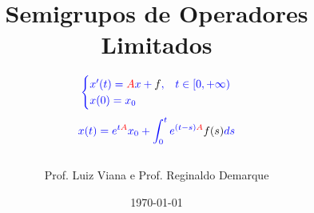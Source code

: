 \documentclass[envcountsect,aspectratio=169]{beamer}
\theoremstyle{definition}
\theoremstyle{exercicio}
\theoremstyle{something}
\theoremstyle{resp}
\theoremstyle{desafio}
\begin{document}
\title[Mini-Curso de Semigrupo]{Semigrupos de Operadores Limitados}
\author[Luiz Viana/Reginaldo Demarque]{
\vspace{-.5cm}
\begin{equation*}
{\normalsize {\color{blue} 
\begin{cases}
x'(t)={\color{red}A}x+{\color{black}f},& t\in [0,+\infty)\\
x(0)=x_0
\end{cases}}
}
\end{equation*}
\begin{equation*}
{\footnotesize {\color{blue} 
x(t)=e^{t\color{red}A}x_0+\int_0^t e^{(t-s)\color{red}A}{\color{black}f(s)}ds}
}
\end{equation*}\\
Prof. Luiz Viana e Prof. Reginaldo Demarque}



\date{{\color{orange} \today}}

\frame{\titlepage}





\end{document}
